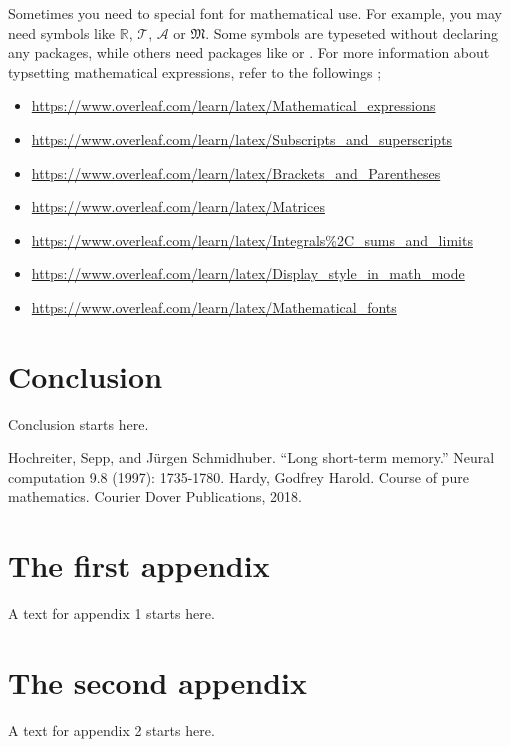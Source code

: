 \documentclass{report}
\begin{document}
Sometimes you need to special font for mathematical use.
For example, you may need symbols like \(\mathbb R\), \(\mathcal T\), \(\mathscr A\) or \(\mathfrak M\).
Some symbols are typeseted without declaring any packages, while others need packages like  or .
For more information about typsetting mathematical expressions, refer to the followings ;
\begin{itemize}
\item
\url{https://www.overleaf.com/learn/latex/Mathematical_expressions}
\item
\url{https://www.overleaf.com/learn/latex/Subscripts_and_superscripts}
\item
\url{https://www.overleaf.com/learn/latex/Brackets_and_Parentheses}
\item
\url{https://www.overleaf.com/learn/latex/Matrices}
\item
\url{https://www.overleaf.com/learn/latex/Integrals\%2C_sums_and_limits}
\item
\url{https://www.overleaf.com/learn/latex/Display_style_in_math_mode}
\item
\url{https://www.overleaf.com/learn/latex/Mathematical_fonts}
\end{itemize}

\chapter{Conclusion}\label{chap:conclusion}
Conclusion starts here.

\renewcommand\bibname{Reference(or Bibliography)}
\begin{thebibliography}{AA}
 Hochreiter, Sepp, and Jürgen Schmidhuber. ``Long short-term memory.'' Neural computation 9.8 (1997): 1735-1780.
 Hardy, Godfrey Harold. Course of pure mathematics. Courier Dover Publications, 2018.
\end{thebibliography}
%
%
%

\appendix
{}
\chapter{The first  appendix}
A text for appendix 1 starts here.
\chapter{The second appendix}
A text for appendix 2 starts here.

\printindex
\end{document}
